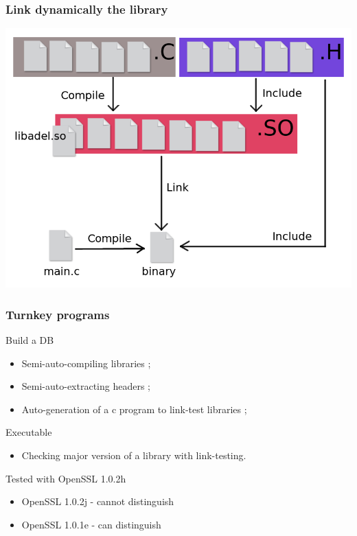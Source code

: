 \documentclass[11pt]{beamer}
\begin{document}
\begin{frame}
    \frametitle{Link dynamically the library}
    \includegraphics[scale=0.38]{compil2.png}
\end{frame}

\begin{frame}
    \frametitle{Turnkey programs} 
    \begin{block}{Build a DB}
        \begin{itemize}
            \item Semi-auto-compiling libraries ;
            \item Semi-auto-extracting headers ;
            \item Auto-generation of a c program to link-test libraries ;
        \end{itemize}
    \end{block}
    \begin{block}{Executable}
         \begin{itemize}
                \item Checking major version of a library with link-testing. 
         \end{itemize}
    \end{block}
    \begin{block}{Tested with OpenSSL 1.0.2h}
        \begin{itemize}
            \item OpenSSL 1.0.2j - cannot distinguish 
            \item OpenSSL 1.0.1e - can distinguish
        \end{itemize}
    \end{block}

\end{frame}
\end{document}
